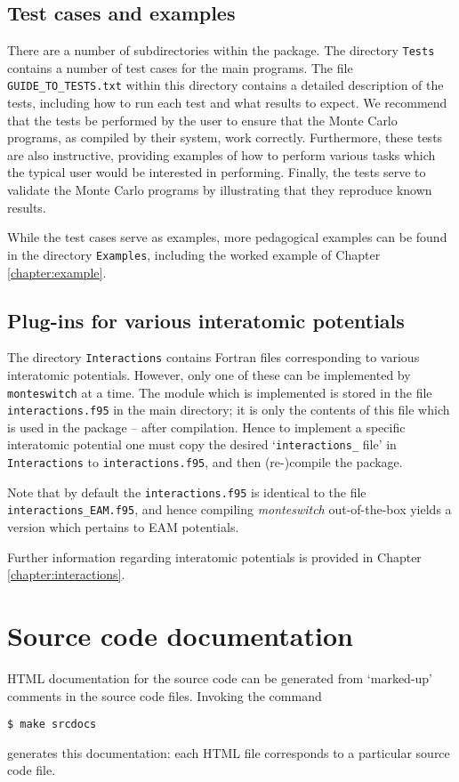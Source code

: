 \documentclass{report}
\begin{document}
\subsection{Test cases and examples}
There are a number of subdirectories within the package. The directory \texttt{Tests} contains a number of test cases for the main programs. The file
\texttt{GUIDE\_TO\_TESTS.txt} within this directory contains a detailed description of the tests, including how to run each test and what results 
to expect. We recommend that the tests be performed by the user to ensure that the Monte Carlo programs, as compiled by their system, work
correctly. Furthermore, these tests are also instructive, providing examples of how to perform various tasks which the typical user would be 
interested in performing. Finally, the tests serve to validate the Monte Carlo programs by illustrating that they reproduce known results.

While the test cases serve as examples, more pedagogical examples can be found in the directory \texttt{Examples}, including the worked example
of Chapter \ref{chapter:example}.

\subsection{Plug-ins for various interatomic potentials}
The directory \texttt{Interactions} contains Fortran files corresponding to various interatomic potentials. However, only one of these can be implemented 
by \texttt{monteswitch} at a time. The module which is implemented is stored in the file \texttt{interactions.f95} in the main directory; it is only the 
contents of this file which is used in the package -- after compilation. Hence to implement a specific interatomic potential one must copy
the desired `\texttt{interactions\_} file' in \texttt{Interactions} to \texttt{interactions.f95}, and then (re-)compile the package.

Note that by default the \texttt{interactions.f95} is identical to the file \texttt{interactions\_EAM.f95}, and hence compiling \emph{monteswitch}
out-of-the-box yields a version which pertains to EAM potentials.

Further information regarding interatomic potentials is provided in Chapter \ref{chapter:interactions}.

\section{Source code documentation}
HTML documentation for the source code can be generated from `marked-up' comments in the source code files. Invoking the command 
\begin{verbatim}
$ make srcdocs
\end{verbatim}
generates this documentation: each HTML file corresponds to a particular source code file.
\end{document}
